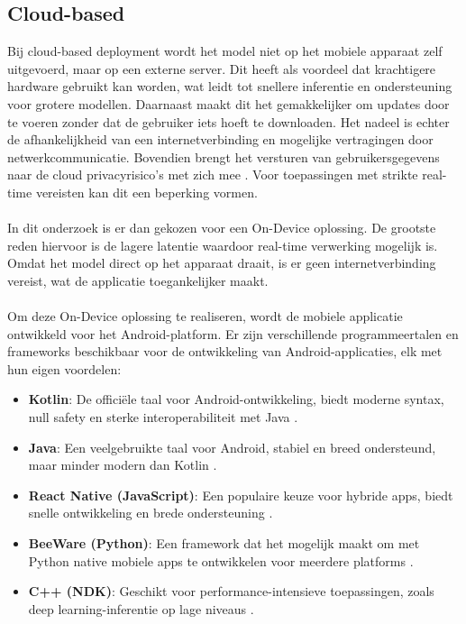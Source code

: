 \subsection{Cloud-based}
\label{subsec:cloud-based}
Bij cloud-based deployment wordt het model niet op het mobiele apparaat zelf uitgevoerd, maar op een externe server. 
Dit heeft als voordeel dat krachtigere hardware gebruikt kan worden, wat leidt tot snellere inferentie en ondersteuning voor grotere modellen. 
Daarnaast maakt dit het gemakkelijker om updates door te voeren zonder dat de gebruiker iets hoeft te downloaden. 
Het nadeel is echter de afhankelijkheid van een internetverbinding en mogelijke vertragingen door netwerkcommunicatie. 
Bovendien brengt het versturen van gebruikersgegevens naar de cloud privacyrisico’s met zich mee \autocite{8360327}.
Voor toepassingen met strikte real-time vereisten kan dit een beperking vormen.
\\
\\
In dit onderzoek is er dan gekozen voor een On-Device oplossing.
De grootste reden hiervoor is de lagere latentie waardoor real-time verwerking mogelijk is.
Omdat het model direct op het apparaat draait, is er geen internetverbinding vereist, wat de applicatie toegankelijker maakt.
\\
\\
Om deze On-Device oplossing te realiseren, wordt de mobiele applicatie ontwikkeld voor het Android-platform. Er zijn verschillende programmeertalen en frameworks beschikbaar voor de ontwikkeling van Android-applicaties, elk met hun eigen voordelen:

\begin{itemize}
  \item \textbf{Kotlin}: De officiële taal voor Android-ontwikkeling, biedt moderne syntax, null safety en sterke interoperabiliteit met Java \autocite{google_kotlin}.  
  \item \textbf{Java}: Een veelgebruikte taal voor Android, stabiel en breed ondersteund, maar minder modern dan Kotlin \autocite{java_android}.  
  \item \textbf{React Native (JavaScript)}: Een populaire keuze voor hybride apps, biedt snelle ontwikkeling en brede ondersteuning \autocite{react_native}.  
  \item \textbf{BeeWare (Python)}: Een framework dat het mogelijk maakt om met Python native mobiele apps te ontwikkelen voor meerdere platforms \autocite{beeware}.  
  \item \textbf{C++ (NDK)}: Geschikt voor performance-intensieve toepassingen, zoals deep learning-inferentie op lage niveaus \autocite{android_ndk}.  
\end{itemize}

